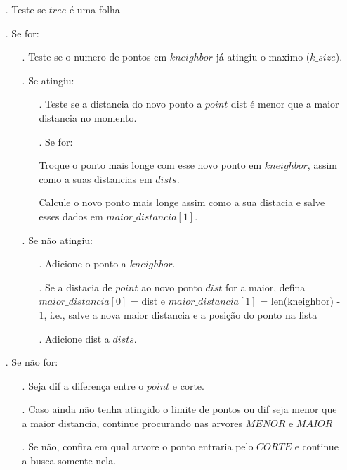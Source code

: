\documentclass{article}
\begin{document}
\begin{enumerate}
		\begin{enumerate}
	
		\item[.] Teste se $tree$ é uma folha
		
		\item[.] Se for:

			\begin{enumerate}
			\item[.] Teste se o numero de pontos em $kneighbor$ já atingiu o maximo ($k\_size$).
			
			\item[.] Se atingiu:
				\begin{enumerate}
				\item[.] Teste se a distancia do novo ponto a $point$ dist é menor que a maior distancia no momento.

				\item[.] Se for:

					\quad Troque o ponto mais longe com esse novo ponto em $kneighbor$, assim como a suas distancias em $dists$.

					\quad Calcule o novo ponto mais longe assim como a sua distacia e salve esses dados em $maior\_distancia[1]$.
					
				
				\end{enumerate}

			\item[.] Se não atingiu:
				\begin{enumerate}
				\item[.] Adicione o ponto a $kneighbor$.
				\item[.] Se a distacia de $point$ ao novo ponto $dist$ for a maior, defina $maior\_distancia[0]$ = dist e $maior\_distancia[1]$ = len(kneighbor) - 1, i.e., salve a nova maior distancia e a posição do ponto na lista
				\item[.] Adicione dist a $dists$.				
				\end{enumerate}

			\end{enumerate}
		


		\item[.] Se não for:
			
			\begin{enumerate}
			\item[.] Seja dif a diferença entre o $point$ e corte.
			\item[.] Caso ainda não tenha atingido o limite de pontos ou dif seja menor que a maior distancia, continue procurando nas arvores $MENOR$ e $MAIOR$
			\item[.] Se não, confira em qual arvore o ponto entraria pelo $CORTE$ e continue a busca somente nela.


\end{enumerate}
\end{enumerate}
\end{enumerate}
\end{document}
